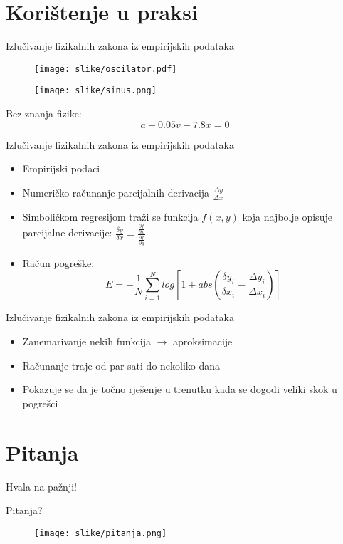 \documentclass[utf8]{beamer}
\begin{document}
\section{Korištenje u praksi}

\begin{frame}{Izlučivanje fizikalnih zakona iz empirijskih podataka}
\begin{figure}
\centering
\texttt{[image: slike/oscilator.pdf]}
\end{figure}
\begin{figure}
\centering
\texttt{[image: slike/sinus.png]}
\end{figure}

Bez znanja fizike:
\begin{equation}
a-0.05v-7.8x=0
\end{equation}

\end{frame}


\begin{frame}{Izlučivanje fizikalnih zakona iz empirijskih podataka}
\begin{itemize}
\item Empirijski podaci
\pause
\item Numeričko računanje parcijalnih derivacija $\frac{\Delta y}{\Delta x}$
\pause
\item Simboličkom regresijom traži se funkcija $f(x,y)$ koja najbolje opisuje parcijalne derivacije: $\frac{\delta y}{\delta x}=\frac{\frac{\partial f}{\partial x}}{\frac{\partial f}{\partial y}}$
\pause
\item Račun pogreške:
\begin{equation}
E = -\frac{1}{N} \sum_{i=1}^{N} log\left [1+abs(\frac{\delta y_{i}}{\delta x_{i}}-\frac{\Delta y_{i}}{\Delta x_{i}}) \right ]
\end{equation}
\end{itemize}
\end{frame}

\begin{frame}{Izlučivanje fizikalnih zakona iz empirijskih podataka}
\begin{itemize}
\item Zanemarivanje nekih funkcija $\rightarrow$ aproksimacije
\pause
\item Računanje traje od par sati do nekoliko dana
\pause
\item Pokazuje se da je točno rješenje u trenutku kada se dogodi veliki skok u pogrešci
\end{itemize}
\end{frame}


\section{Pitanja}
\begin{frame}{}
\center
\Huge{Hvala na pažnji!}
\end{frame}

\begin{frame}{}
\center
\Huge{Pitanja?}
\begin{figure}
\centering
\texttt{[image: slike/pitanja.png]}
\end{figure}
\end{frame}
\end{document}
